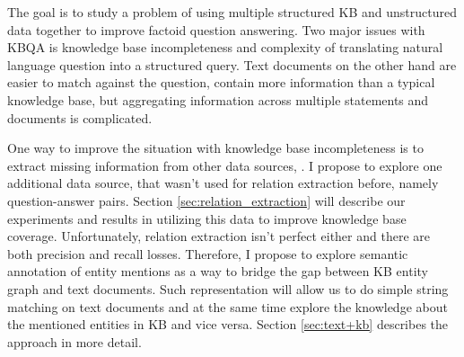 The goal is to study a problem of using multiple structured KB and unstructured data together to improve factoid question answering.
Two major issues with KBQA is knowledge base incompleteness and complexity of translating natural language question into a structured query.
Text documents on the other hand are easier to match against the question, contain more information than a typical knowledge base, but aggregating information across multiple statements and documents is complicated.

One way to improve the situation with knowledge base incompleteness is to extract missing information from other data sources, \eg \cite{Cafarella:2008:WEP:1453856.1453916,Cafarella:2009:WES:1519103.1519112,Dong:2014:KVW:2623330.2623623,Etzioni:2008:OIE:1409360.1409378,Gupta:2014:BOS:2732286.2732288,kushmerick1997wrapper}.
I propose to explore one additional data source, that wasn't used for relation extraction before, namely question-answer pairs.
Section \ref{sec:relation_extraction} will describe our experiments and results in utilizing this data to improve knowledge base coverage.
Unfortunately, relation extraction isn't perfect either and there are both precision and recall losses.
Therefore, I propose to explore semantic annotation of entity mentions as a way to bridge the gap between KB entity graph and text documents.
Such representation will allow us to do simple string matching on text documents and at the same time explore the knowledge about the mentioned entities in KB and vice versa. Section \ref{sec:text+kb} describes the approach in more detail.



